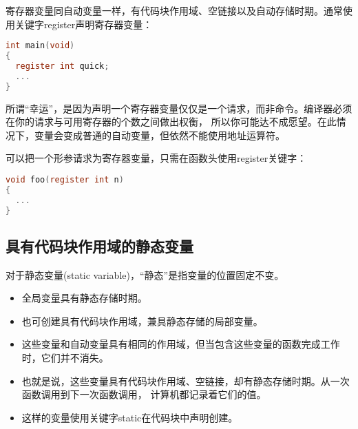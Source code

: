 \begin{frame}[fragile]\ft{\subsecname}

寄存器变量同自动变量一样，有代码块作用域、空链接以及自动存储时期。通常使用关键字{\tf register}声明寄存器变量：
\begin{lstlisting}[language=c,frame=single]
int main(void)
{
  register int quick;
  ...
}    
\end{lstlisting}
\end{frame}

\begin{frame}[fragile]\ft{\subsecname}
所谓“幸运”，是因为声明一个寄存器变量仅仅是一个请求，而非命令。编译器必须在你的请求与可用寄存器的个数之间做出权衡，
所以你可能达不成愿望。在此情况下，变量会变成普通的自动变量，但依然不能使用地址运算符。
\end{frame}

\begin{frame}[fragile]\ft{\subsecname}
可以把一个形参请求为寄存器变量，只需在函数头使用register关键字：
\begin{lstlisting}[language=c,frame=single]
void foo(register int n)
{
  ...
}    
\end{lstlisting}
\end{frame}

\subsection{具有代码块作用域的静态变量}
\begin{frame}[fragile]\ft{\subsecname}
对于静态变量{\tf (static variable)}，“静态”是指变量的位置固定不变。\vspace{0.05in}

\begin{itemize}
\item 全局变量具有静态存储时期。\\[0.15in]
\item 也可创建具有代码块作用域，兼具静态存储的局部变量。\\[0.1in]
\item[] 这些变量和自动变量具有相同的作用域，但当包含这些变量的函数完成工作时，它们并不消失。\\[0.1in]
\item[] 也就是说，这些变量具有代码块作用域、空链接，却有静态存储时期。从一次函数调用到下一次函数调用，
计算机都记录着它们的值。\\[0.1in]
\item[] 这样的变量使用关键字{\tf static}在代码块中声明创建。
\end{itemize}
\end{frame}

